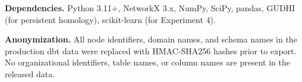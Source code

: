 \documentclass[11pt,a4paper]{article}
\begin{document}
\noindent\textbf{Dependencies.} Python 3.11+, NetworkX 3.x, NumPy, SciPy, pandas,
GUDHI (for persistent homology), scikit-learn (for Experiment 4).

\noindent\textbf{Anonymization.} All node identifiers, domain names, and schema
names in the production dbt data were replaced with HMAC-SHA256 hashes
prior to export. No organizational identifiers, table names, or column
names are present in the released data.



\end{document}
